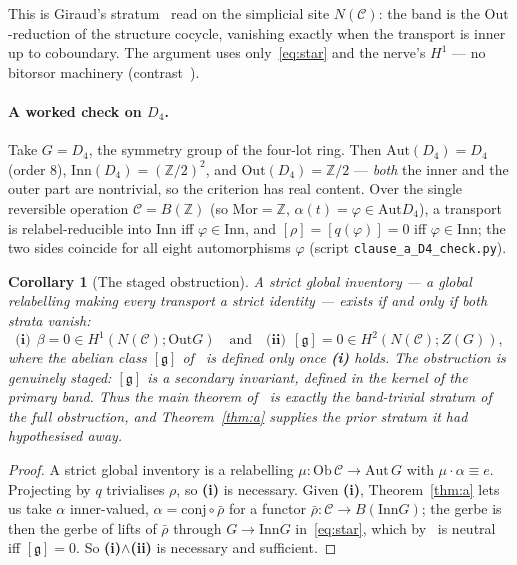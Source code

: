 \documentclass[11pt]{article}
\newtheorem{corollary}[theorem]{Corollary}
\theoremstyle{definition}
\newcommand{\C}{\mathcal{C}}
\newcommand{\Ob}{\mathrm{Ob}}
\newcommand{\Mor}{\mathrm{Mor}}
\newcommand{\Z}{\mathbb{Z}}
\newcommand{\Aut}{\mathrm{Aut}}
\newcommand{\Inn}{\mathrm{Inn}}
\newcommand{\Out}{\mathrm{Out}}
\newcommand{\gerbe}{\mathfrak{g}}
\begin{document}
This is Giraud's stratum~\cite{giraud} read on the simplicial site $N(\C)$: the band is the
$\Out$-reduction of the structure cocycle, vanishing exactly when the transport is inner up to
coboundary. The argument uses only~\eqref{eq:star} and the nerve's $H^1$ --- no bitorsor machinery
(contrast~\cite{breen}).

\paragraph{A worked check on $D_4$.} Take $G=D_4$, the symmetry group of the four-lot ring. Then
$\Aut(D_4)=D_4$ (order $8$), $\Inn(D_4)=(\Z/2)^2$, and $\Out(D_4)=\Z/2$ --- \emph{both} the inner and
the outer part are nontrivial, so the criterion has real content. Over the single reversible operation
$\C=B(\Z)$ (so $\Mor=\Z$, $\alpha(t)=\varphi\in\Aut D_4$), a transport is relabel-reducible into
$\Inn$ iff $\varphi\in\Inn$, and $[\rho]=[q(\varphi)]=0$ iff $\varphi\in\Inn$; the two sides coincide
for all eight automorphisms $\varphi$ (script \texttt{clause\_a\_D4\_check.py}).

\begin{corollary}[The staged obstruction]\label{cor:aprime}
A strict global inventory --- a global relabelling making every transport a strict identity --- exists
if and only if both strata vanish:
\[
\textbf{(i)}\ \ \beta=0\in H^1(N(\C);\Out G)\quad\text{and}\quad
\textbf{(ii)}\ \ [\gerbe]=0\in H^2(N(\C);Z(G)),
\]
where the abelian class $[\gerbe]$ of~\cite{gerbenote} is defined only once \textbf{(i)} holds. The
obstruction is genuinely staged: $[\gerbe]$ is a secondary invariant, defined in the kernel of the
primary band. Thus the main theorem of~\cite{gerbenote} is exactly the band-trivial stratum of the
full obstruction, and Theorem~\ref{thm:a} supplies the prior stratum it had hypothesised away.
\end{corollary}

\begin{proof}
A strict global inventory is a relabelling $\mu:\Ob\,\C\to\Aut\,G$ with $\mu\cdot\alpha\equiv e$.
Projecting by $q$ trivialises $\rho$, so \textbf{(i)} is necessary. Given \textbf{(i)},
Theorem~\ref{thm:a} lets us take $\alpha$ inner-valued, $\alpha=\mathrm{conj}\circ\bar\rho$ for a
functor $\bar\rho:\C\to B(\Inn G)$; the gerbe is then the gerbe of lifts of $\bar\rho$ through
$G\to\Inn G$ in~\eqref{eq:star}, which by~\cite{gerbenote} is neutral iff $[\gerbe]=0$. So
\textbf{(i)}$\wedge$\textbf{(ii)} is necessary and sufficient.
\end{proof}
\end{document}
